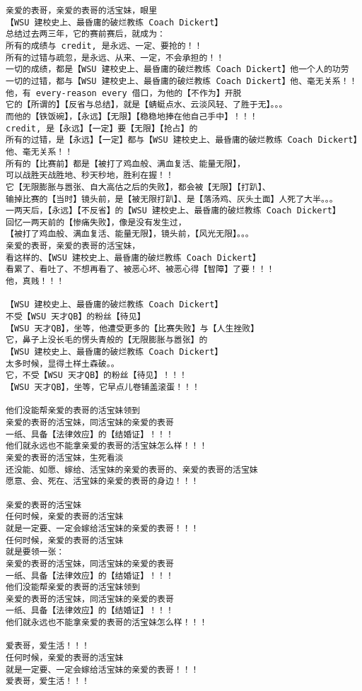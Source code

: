 \documentclass[9pt, b5paper]{article}
\begin{document}
\begin{verbatim}
亲爱的表哥，亲爱的表哥的活宝妹，眼里
【WSU 建校史上、最昏庸的破烂教练 Coach Dickert】
总结过去两三年，它的赛前赛后，就成为：
所有的成绩与 credit, 是永远、一定、要抢的！！
所有的过错与疏忽，是永远、从来、一定，不会承担的！！
一切的成绩，都是【WSU 建校史上、最昏庸的破烂教练 Coach Dickert】他一个人的功劳
一切的过错，都与【WSU 建校史上、最昏庸的破烂教练 Coach Dickert】他、毫无关系！！
他，有 every-reason every 借口，为他的【不作为】开脱
它的【所谓的】【反省与总结】，就是【蜻蜓点水、云淡风轻、了胜于无】。。。
而他的【铁饭碗】，【永远】【无限】【稳稳地捧在他自己手中】！！！
credit, 是【永远】【一定】要【无限】【抢占】的
所有的过错，是【永远】【一定】都与【WSU 建校史上、最昏庸的破烂教练 Coach Dickert】他、毫无关系！！
所有的【比赛前】都是【被打了鸡血般、满血复活、能量无限】，
可以战胜天战胜地、秒天秒地，胜利在握！！
它【无限膨胀与嚣张、自大高估之后的失败】，都会被【无限】【打趴】、
输掉比赛的【当时】镜头前，是【被无限打趴】、是【落汤鸡、灰头土面】人死了大半。。。
一两天后，【永远】【不反省】的【WSU 建校史上、最昏庸的破烂教练 Coach Dickert】
回忆一两天前的【惨痛失败】，像是没有发生过，
【被打了鸡血般、满血复活、能量无限】，镜头前，【风光无限】。。。
亲爱的表哥，亲爱的表哥的活宝妹，
看这样的、【WSU 建校史上、最昏庸的破烂教练 Coach Dickert】
看累了、看吐了、不想再看了、被恶心坏、被恶心得【智障】了要！！！
他，真贱！！！

【WSU 建校史上、最昏庸的破烂教练 Coach Dickert】
不受【WSU 天才QB】的粉丝【待见】
【WSU 天才QB】，坐等，他遭受更多的【比赛失败】与【人生挫败】
它，鼻子上没长毛的愣头青般的【无限膨胀与嚣张】的
【WSU 建校史上、最昏庸的破烂教练 Coach Dickert】
太多时候，显得土样土森破。。
它，不受【WSU 天才QB】的粉丝【待见】！！！
【WSU 天才QB】，坐等，它早点儿卷铺盖滚蛋！！！

他们没能帮亲爱的表哥的活宝妹领到
亲爱的表哥的活宝妹，同活宝妹的亲爱的表哥
一纸、具备【法律效应】的【结婚证】！！！
他们就永远也不能拿亲爱的表哥的活宝妹怎么样！！！
亲爱的表哥的活宝妹，生死看淡
还没能、如愿、嫁给、活宝妹的亲爱的表哥的、亲爱的表哥的活宝妹
愿意、会、死在、活宝妹的亲爱的表哥的身边！！！

亲爱的表哥的活宝妹
任何时候，亲爱的表哥的活宝妹
就是一定要、一定会嫁给活宝妹的亲爱的表哥！！！
任何时候，亲爱的表哥的活宝妹
就是要领一张：
亲爱的表哥的活宝妹，同活宝妹的亲爱的表哥
一纸、具备【法律效应】的【结婚证】！！！
他们没能帮亲爱的表哥的活宝妹领到
亲爱的表哥的活宝妹，同活宝妹的亲爱的表哥
一纸、具备【法律效应】的【结婚证】！！！
他们就永远也不能拿亲爱的表哥的活宝妹怎么样！！！

爱表哥，爱生活！！！
任何时候，亲爱的表哥的活宝妹
就是一定要、一定会嫁给活宝妹的亲爱的表哥！！！
爱表哥，爱生活！！！
\end{verbatim}
\end{document}

